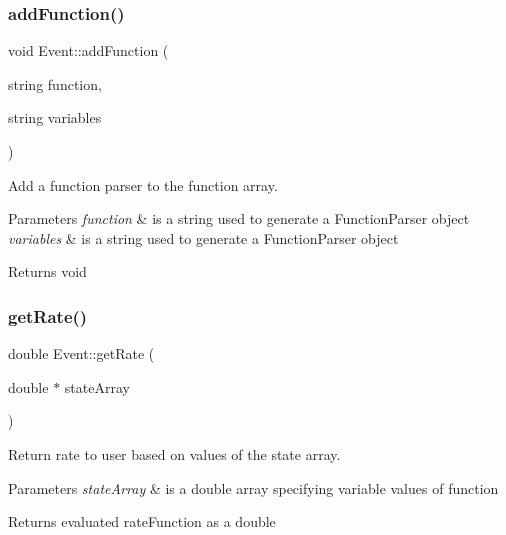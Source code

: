 \subsubsection{\texorpdfstring{add\+Function()}{addFunction()}}
{\footnotesize\ttfamily void Event\+::add\+Function (\begin{DoxyParamCaption}\item[{string}]{function,  }\item[{string}]{variables }\end{DoxyParamCaption})}



Add a function parser to the function array. 


\begin{DoxyParams}{Parameters}
{\em function} & is a string used to generate a Function\+Parser object \\
\hline
{\em variables} & is a string used to generate a Function\+Parser object \\
\hline
\end{DoxyParams}
\begin{DoxyReturn}{Returns}
void 
\end{DoxyReturn}
\mbox{\label{class_event_a2288e3b3fa19e076e04bba11b88d189a}} 
\subsubsection{\texorpdfstring{get\+Rate()}{getRate()}}
{\footnotesize\ttfamily double Event\+::get\+Rate (\begin{DoxyParamCaption}\item[{double $\ast$}]{state\+Array }\end{DoxyParamCaption})}



Return rate to user based on values of the state array. 


\begin{DoxyParams}{Parameters}
{\em state\+Array} & is a double array specifying variable values of function \\
\hline
\end{DoxyParams}
\begin{DoxyReturn}{Returns}
evaluated rate\+Function as a double 
\end{DoxyReturn}
\mbox{\label{class_event_a1a0f2e2dc0b203f7be0f1d5b8810c6a2}} 
